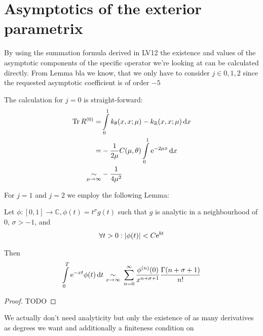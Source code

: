 \section{Asymptotics of the exterior parametrix}
By using the summation formula derived in LV12 the existence and values of the
asymptotic components of the specific operator we're looking at can be
calculated directly. From Lemma bla we know, that we only have to consider $j\in
{0, 1, 2}$ since the requested asymptotic coefficient is of order $-5$ %

The calculation for $j=0$ is straight-forward:
\begin{align}
    \Tr R^{(0)} =& \Integ[1]{0}{x}{k_\theta(x,x;\mu) - k_\mathbb{R}(x,x;\mu)} \\
    =& -\frac1{2\mu} C(\mu,\theta) \Integ[1]{0}{x}{\Eto{-2\mu x}} \\
    \SimAs{\mu\to\infty}& -\frac1{4\mu^2}
    \label{eqn:jeq0}
\end{align}

For $j=1$ and $j=2$ we employ the following Lemma:
\begin{Lemma}[Watson]
    \label{watson}
    Let $\phi\colon [0,1] \to \mathbb{C}, \phi(t) = t^\sigma g(t)$ such that $g$ is
    analytic in a neighbourhood of $0$, $\sigma > -1$, and
    \begin{align*}
        \forall t > 0: \left|\phi(t)\right| < C \Eto{bt}
    \end{align*}

    Then
    \begin{align*}
        \Integ[T]{0}{t}{\Eto{-xt}\phi(t)}\ \SimAs{x\to\infty}\ \sum_{n=0}^{\infty}
        \frac{\phi^{(n)}(0)}{x^{n+\sigma+1}} \frac{\Gamma(n+\sigma+1)}{n!}
    \end{align*}

    \begin{proof}
        TODO
    \end{proof}
    \begin{Remark}
        We actually don't need analyticity but only the existence of as many
        derivatives as degrees we want and additionally a finiteness condition
        on
    \end{Remark}
\end{Lemma}

